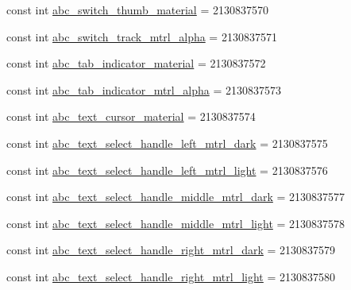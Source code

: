 \begin{DoxyCompactItemize}
\item 
const int \mbox{\hyperlink{class_f_w_p_s___app_1_1_droid_1_1_resource_1_1_drawable_a074f38946bd0a0f10108dd62e33d7683}{abc\+\_\+switch\+\_\+thumb\+\_\+material}} = 2130837570
\item 
const int \mbox{\hyperlink{class_f_w_p_s___app_1_1_droid_1_1_resource_1_1_drawable_ab711d276a096053b6c7befc9b0dd7639}{abc\+\_\+switch\+\_\+track\+\_\+mtrl\+\_\+alpha}} = 2130837571
\item 
const int \mbox{\hyperlink{class_f_w_p_s___app_1_1_droid_1_1_resource_1_1_drawable_a4a77c674bed1826b23607c2105faa97f}{abc\+\_\+tab\+\_\+indicator\+\_\+material}} = 2130837572
\item 
const int \mbox{\hyperlink{class_f_w_p_s___app_1_1_droid_1_1_resource_1_1_drawable_a59fe2f080716151842f5252d4e6b1362}{abc\+\_\+tab\+\_\+indicator\+\_\+mtrl\+\_\+alpha}} = 2130837573
\item 
const int \mbox{\hyperlink{class_f_w_p_s___app_1_1_droid_1_1_resource_1_1_drawable_a3ee94ff8c6d95e99d49c13d3a0767ffc}{abc\+\_\+text\+\_\+cursor\+\_\+material}} = 2130837574
\item 
const int \mbox{\hyperlink{class_f_w_p_s___app_1_1_droid_1_1_resource_1_1_drawable_acd6f28e32b6af81114f40c39c6f95f44}{abc\+\_\+text\+\_\+select\+\_\+handle\+\_\+left\+\_\+mtrl\+\_\+dark}} = 2130837575
\item 
const int \mbox{\hyperlink{class_f_w_p_s___app_1_1_droid_1_1_resource_1_1_drawable_a2f61b63aa58c02ade5f61a2fa05c51c5}{abc\+\_\+text\+\_\+select\+\_\+handle\+\_\+left\+\_\+mtrl\+\_\+light}} = 2130837576
\item 
const int \mbox{\hyperlink{class_f_w_p_s___app_1_1_droid_1_1_resource_1_1_drawable_ab371081c631f93fe9b50ea20148a512f}{abc\+\_\+text\+\_\+select\+\_\+handle\+\_\+middle\+\_\+mtrl\+\_\+dark}} = 2130837577
\item 
const int \mbox{\hyperlink{class_f_w_p_s___app_1_1_droid_1_1_resource_1_1_drawable_a2650cff902e5737ef12fe1498800260b}{abc\+\_\+text\+\_\+select\+\_\+handle\+\_\+middle\+\_\+mtrl\+\_\+light}} = 2130837578
\item 
const int \mbox{\hyperlink{class_f_w_p_s___app_1_1_droid_1_1_resource_1_1_drawable_ab445dd0003eb3715b08182eb6ace1db7}{abc\+\_\+text\+\_\+select\+\_\+handle\+\_\+right\+\_\+mtrl\+\_\+dark}} = 2130837579
\item 
const int \mbox{\hyperlink{class_f_w_p_s___app_1_1_droid_1_1_resource_1_1_drawable_a6d0392a6f2d99e0a799940ddbd594cfe}{abc\+\_\+text\+\_\+select\+\_\+handle\+\_\+right\+\_\+mtrl\+\_\+light}} = 2130837580

\end{DoxyCompactItemize}
